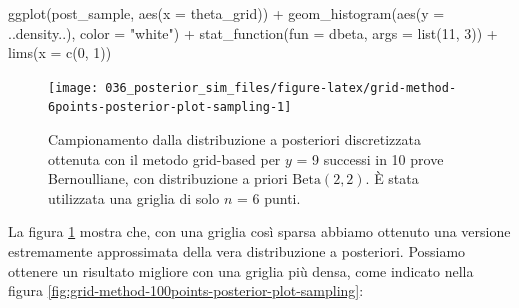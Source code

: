 \documentclass[
  10pt,
  italian,
  a4paper,
  extrafontsizes,onecolumn,openright
  ]{memoir}
\newenvironment{Shaded}{\begin{snugshade}}{\end{snugshade}}
\newcommand{\AttributeTok}[1]{\textcolor[rgb]{0.77,0.63,0.00}{#1}}
\newcommand{\DecValTok}[1]{\textcolor[rgb]{0.00,0.00,0.81}{#1}}
\newcommand{\FunctionTok}[1]{\textcolor[rgb]{0.00,0.00,0.00}{#1}}
\newcommand{\NormalTok}[1]{#1}
\newcommand{\SpecialCharTok}[1]{\textcolor[rgb]{0.00,0.00,0.00}{#1}}
\newcommand{\StringTok}[1]{\textcolor[rgb]{0.31,0.60,0.02}{#1}}
\begin{document}
\begin{Shaded}
\begin{Highlighting}[]
\FunctionTok{ggplot}\NormalTok{(post\_sample, }\FunctionTok{aes}\NormalTok{(}\AttributeTok{x =}\NormalTok{ theta\_grid)) }\SpecialCharTok{+}
  \FunctionTok{geom\_histogram}\NormalTok{(}\FunctionTok{aes}\NormalTok{(}\AttributeTok{y =}\NormalTok{ ..density..), }\AttributeTok{color =} \StringTok{"white"}\NormalTok{) }\SpecialCharTok{+}
  \FunctionTok{stat\_function}\NormalTok{(}\AttributeTok{fun =}\NormalTok{ dbeta, }\AttributeTok{args =} \FunctionTok{list}\NormalTok{(}\DecValTok{11}\NormalTok{, }\DecValTok{3}\NormalTok{)) }\SpecialCharTok{+}
  \FunctionTok{lims}\NormalTok{(}\AttributeTok{x =} \FunctionTok{c}\NormalTok{(}\DecValTok{0}\NormalTok{, }\DecValTok{1}\NormalTok{))}
\end{Highlighting}
\end{Shaded}

\begin{figure}[h]

{\centering \texttt{[image: 036\_posterior\_sim\_files/figure-latex/grid-method-6points-posterior-plot-sampling-1]} 

}

\caption{Campionamento dalla  distribuzione a posteriori discretizzata ottenuta con il metodo grid-based per $y$ = 9 successi in 10 prove Bernoulliane, con distribuzione a priori $\mbox{Beta}(2, 2)$. È stata utilizzata una griglia di solo $n$ = 6 punti.}\label{fig:grid-method-6points-posterior-plot-sampling}
\end{figure}

\noindent
La figura \ref{fig:grid-method-6points-posterior-plot-sampling} mostra che, con una griglia così sparsa abbiamo ottenuto una versione estremamente approssimata della vera distribuzione a posteriori. Possiamo ottenere un risultato migliore con una griglia più densa, come indicato nella figura \ref{fig:grid-method-100points-posterior-plot-sampling}:
\end{document}

